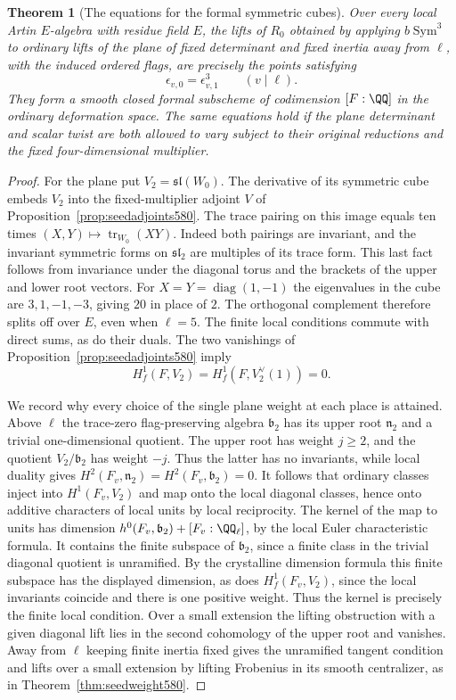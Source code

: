 \documentclass[a4paper,11pt]{article}
\newtheorem{theorem}[proposition]{Theorem}
\theoremstyle{definition}
\theoremstyle{remark}
\numberwithin{equation}{section}
\begin{document}
\begin{theorem}[The equations for the formal symmetric cubes]
\leavevmode\label{thm:cubeweights584}
Over every local Artin \(E\)-algebra with residue field \(E\),
the lifts of \(R_0\) obtained by applying \(b\operatorname{Sym}^3\)
to ordinary lifts of the plane of fixed determinant and fixed
inertia away from \(\ell\), with the induced ordered flags, are
precisely the points satisfying
\[
                  \epsilon_{v,0}=\epsilon_{v,1}^3
                         \qquad(v\mid\ell).
\]
They form a smooth closed formal subscheme of codimension
\([F:\QQ]\) in the ordinary deformation space. The same equations
hold if the plane determinant and scalar twist are both allowed
to vary subject to their original reductions and the fixed
four-dimensional multiplier.
\end{theorem}
\begin{proof}
For the plane put \(V_2=\mathfrak{sl}(W_0)\). The derivative
of its symmetric cube embeds \(V_2\) into the fixed-multiplier
adjoint \(V\) of Proposition~\ref{prop:seedadjoints580}.
The trace pairing on this image equals ten times
\((X,Y)\mapsto\operatorname{tr}_{W_0}(XY)\). Indeed both
pairings are invariant, and the invariant symmetric forms on
\(\mathfrak{sl}_2\) are multiples of its trace form. This last
fact follows from invariance under the diagonal torus and the
brackets of the upper and lower root vectors. For
\(X=Y=\operatorname{diag}(1,-1)\) the eigenvalues in the cube
are \(3,1,-1,-3\), giving \(20\) in place of \(2\). The
orthogonal complement therefore splits off over \(E\), even
when \(\ell=5\). The finite local conditions commute with
direct sums, as do their duals. The two vanishings of
Proposition~\ref{prop:seedadjoints580} imply
\[
            H^1_f(F,V_2)=H^1_f(F,V_2^\vee(1))=0 .
\]

We record why every choice of the single plane weight at each
place is attained. Above \(\ell\) the trace-zero flag-preserving
algebra \(\mathfrak b_2\) has its upper root \(\mathfrak n_2\)
and a trivial one-dimensional quotient. The upper root has
weight \(j\ge2\), and the quotient \(V_2/\mathfrak b_2\) has
weight \(-j\). Thus the latter has no invariants, while local
duality gives \(H^2(F_v,\mathfrak n_2)=H^2(F_v,\mathfrak b_2)=0\).
It follows that ordinary classes inject into \(H^1(F_v,V_2)\)
and map onto the local diagonal classes, hence onto additive
characters of local units by local reciprocity. The kernel of
the map to units has dimension
\(h^0(F_v,\mathfrak b_2)+[F_v:\QQ_\ell]\), by the local Euler
characteristic formula. It contains the finite subspace of
\(\mathfrak b_2\), since a finite class in the trivial diagonal
quotient is unramified. By the crystalline dimension formula
this finite subspace has the displayed dimension, as does
\(H^1_f(F_v,V_2)\), since the local invariants coincide and
there is one positive weight. Thus the kernel is precisely
the finite local condition. Over a small extension the lifting
obstruction with a given diagonal lift lies in the second
cohomology of the upper root and vanishes. Away from \(\ell\)
keeping finite inertia fixed gives the unramified tangent
condition and lifts over a small extension by lifting Frobenius
in its smooth centralizer, as in Theorem~\ref{thm:seedweight580}.


\end{proof}
\end{document}
